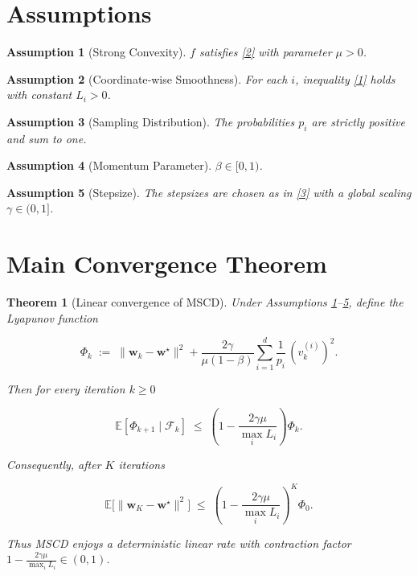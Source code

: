 \documentclass{article}
\newtheorem{theorem}{Theorem}
\newtheorem{assumption}{Assumption}
\newcommand{\E}{\mathbb{E}}
\begin{document}
\section*{Assumptions}
\begin{assumption}[Strong Convexity]\label{as:strong}
$f$ satisfies \eqref{2} with parameter $\mu>0$.
\end{assumption}
\begin{assumption}[Coordinate‑wise Smoothness]\label{as:smooth}
For each $i$, inequality \eqref{1} holds with constant $L_i>0$.
\end{assumption}
\begin{assumption}[Sampling Distribution]\label{as:prob}
The probabilities $p_i$ are strictly positive and sum to one.
\end{assumption}
\begin{assumption}[Momentum Parameter]\label{as:beta}
$\beta\in[0,1)$.
\end{assumption}
\begin{assumption}[Stepsize]\label{as:stepsize}
The stepsizes are chosen as in \eqref{3} with a global scaling $\gamma\in(0,1]$.
\end{assumption}

\section*{Main Convergence Theorem}
\begin{theorem}[Linear convergence of MSCD]\label{thm:linear}
Under Assumptions \ref{as:strong}–\ref{as:stepsize}, define the Lyapunov function  

\[
\Phi_k \;:=\; \|\bm w_k-\bm w^{\star}\|^{2}+ \frac{2\gamma}{\mu(1-\beta)}\sum_{i=1}^{d}\frac{1}{p_i}\, (v_k^{(i)})^{2}.
\tag{5}
\]

Then for every iteration $k\ge 0$  

\[
\E[\Phi_{k+1}\mid\mathcal F_k]\;\le\;\left(1-\frac{2\gamma\mu}{\max_i L_i}\right)\Phi_k .
\tag{6}
\]

Consequently, after $K$ iterations  

\[
\E\big[\|\bm w_K-\bm w^{\star}\|^{2}\big]\;\le\;\left(1-\frac{2\gamma\mu}{\max_i L_i}\right)^{K}\Phi_0 .
\tag{7}
\]

Thus MSCD enjoys a deterministic linear rate with contraction factor
$1-\frac{2\gamma\mu}{\max_i L_i}\in(0,1)$.
\end{theorem}
\end{document}
